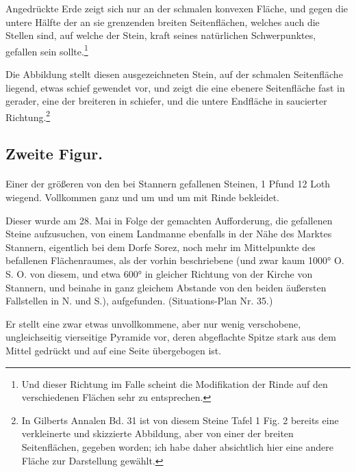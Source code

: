 \documentclass[a4paper, 11pt, oneside, german]{article}
\begin{document}
Angedrückte Erde zeigt sich nur an der schmalen konvexen Fläche, und gegen die untere Hälfte der an sie grenzenden breiten Seitenflächen, welches auch die Stellen sind, auf welche der Stein, kraft seines natürlichen Schwerpunktes, gefallen sein sollte.\footnote{Und dieser Richtung im Falle scheint die Modifikation der Rinde auf den verschiedenen Flächen sehr zu entsprechen.}

Die Abbildung stellt diesen ausgezeichneten Stein, auf der schmalen Seitenfläche liegend, etwas schief gewendet vor, und zeigt die eine ebenere Seitenfläche fast in gerader, eine der breiteren in schiefer, und die untere Endfläche in saucierter Richtung.\footnote{In Gilberts Annalen Bd. 31 ist von diesem Steine Tafel 1 Fig. 2 bereits eine verkleinerte und skizzierte Abbildung, aber von einer der breiten Seitenflächen, gegeben worden; ich habe daher absichtlich hier eine andere Fläche zur Darstellung gewählt.}

\subsection{Zweite Figur.}
\paragraph{}
Einer der größeren von den bei Stannern gefallenen Steinen, 1 Pfund 12 Loth wiegend. Vollkommen ganz und um und um mit Rinde bekleidet.

Dieser wurde am 28. Mai in Folge der gemachten Aufforderung, die gefallenen Steine aufzusuchen, von einem Landmanne ebenfalls in der Nähe des Marktes Stannern, eigentlich bei dem Dorfe Sorez, noch mehr im Mittelpunkte des befallenen Flächenraumes, als der vorhin beschriebene (und zwar kaum 1000° O. S. O. von diesem, und etwa 600° in gleicher Richtung von der Kirche von Stannern, und beinahe in ganz gleichem Abstande von den beiden äußersten Fallstellen in N. und S.), aufgefunden. (Situations-Plan Nr. 35.)

Er stellt eine zwar etwas unvollkommene, aber nur wenig verschobene, ungleichseitig vierseitige Pyramide vor, deren abgeflachte Spitze stark aus dem Mittel gedrückt und auf eine Seite übergebogen ist.
\end{document}
